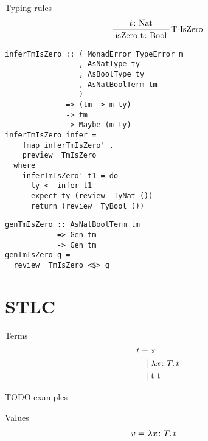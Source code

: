 \documentclass{beamer}
\begin{document}
\begin{frame}
  Typing rules
  \begin{displaymath}  
    \prftree[r]{T-IsZero}
    {t \colon \text{Nat}}
    {\text{isZero t} \colon \text{Bool}}
  \end{displaymath}  
\end{frame}

\begin{frame}[fragile]
  \begin{verbatim}
inferTmIsZero :: ( MonadError TypeError m
                 , AsNatType ty
                 , AsBoolType ty
                 , AsNatBoolTerm tm
                 )
              => (tm -> m ty)
              -> tm
              -> Maybe (m ty)
inferTmIsZero infer =
    fmap inferTmIsZero' . 
    preview _TmIsZero
  where
    inferTmIsZero' t1 = do
      ty <- infer t1
      expect ty (review _TyNat ())
      return (review _TyBool ())
  \end{verbatim}
\end{frame} 

\begin{frame}[fragile]
  \begin{verbatim}
genTmIsZero :: AsNatBoolTerm tm 
            => Gen tm 
            -> Gen tm
genTmIsZero g =
  review _TmIsZero <$> g
  \end{verbatim}
\end{frame} 


\section{STLC}

\begin{frame}[c]
  Terms
  \begin{displaymath}
    \begin{aligned}
t =& \ \text{x} \\
  |& \ \lambda x \colon T \ldotp t \\
  |& \ \text{t t}
    \end{aligned}
  \end{displaymath}
\end{frame}

\begin{frame}[c]
  TODO examples
\end{frame}

\begin{frame}[c]
  Values
  \begin{displaymath}
    \begin{aligned}
v =& \ \lambda x \colon T \ldotp t
    \end{aligned}
  \end{displaymath}
\end{frame}
\end{document}
